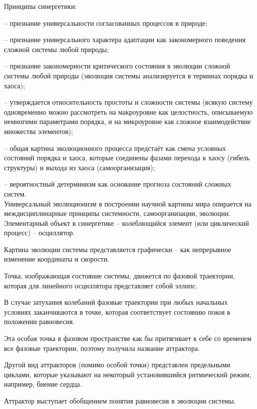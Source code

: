 \documentclass[exam_answers.tex]{subfiles}
\begin{document}
\renewcommand{\baselinestretch}{0.75}

Принципы синергетики:

-- признание универсальности согласованных процессов в природе;

-- признание универсального характера адаптации как закономерного поведения сложной системы любой природы;

-- признание закономерности критического состояния в эволюции сложной системы любой природы (эволюция системы анализируется в терминах порядка и хаоса);

-- утверждается относительность простоты и сложности системы (всякую систему одновременно можно рассмотреть на макроуровне как целостность, описываемую немногими параметрами порядка, и на микроуровне как сложное взаимодействие множества элементов);

-- общая картина эволюционного процесса предстаёт как смена условных состояний порядка и хаоса, которые соединены фазами перехода к хаосу (гибель структуры) и выхода из хаоса (самоорганизация);

-- вероятностный детерминизм как основание прогноза состояний сложных систем.
\\

Универсальный эволюционизм в построении научной картины мира опирается на междисциплинарные принципы системности, самоорганизации, эволюции.
\\

Элементарный объект в синергетике – колеблющийся элемент (или циклический процесс) – осциллятор.

Картина эволюции системы представляется графически – как непрерывное изменение координаты и скорости.

Точка, изображающая состояние системы, движется по фазовой траектории, которая для линейного осциллятора представляет собой эллипс.

В случае затухания колебаний фазовые траектории при любых начальных условиях заканчиваются в точке, которая соответствует состоянию покоя в положении равновесия.

Эта особая точка в фазовом пространстве как бы притягивает к себе со временем все фазовые траектории, поэтому получила название аттрактора.

Другой вид аттракторов (помимо особой точки) представлен предельными циклами, которые указывают на некоторый установившийся ритмический режим, например, биение сердца.

Аттрактор выступает обобщением понятия равновесия в эволюции системы.
\end{document}
